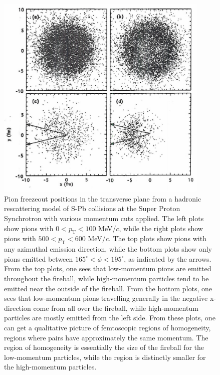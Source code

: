 \begin{figure}[hbtp]
\includegraphics[width=24pc]{Figures/BorrowedFigures/fighbt12.pdf}
\caption[Regions of homogeneity]{
Pion freezeout positions in the transverse plane from a hadronic rescattering model \cite{Humanic:2005ye} of S-Pb collisions at the Super Proton Synchrotron with various momentum cuts applied. 
The left plots show pions with $0 < p_\mathrm{T} < 100$ MeV/$c$, while the right plots show pions with $500 < p_\mathrm{T} < 600$ MeV/$c$.
The top plots show pions with any azimuthal emission direction, while the bottom plots show only pions emitted between $165^\circ < \phi < 195^\circ$, as indicated by the arrows.
From the top plots, one sees that low-momentum pions are emitted throughout the fireball, while high-momentum particles tend to be emitted near the outside of the fireball.
From the bottom plots, one sees that low-momentum pions travelling generally in the negative x-direction come from all over the fireball, while high-momentum particles are mostly emitted from the left side.
From these plots, one can get a qualitative picture of femtoscopic regions of homogeneity, regions where pairs have approximately the same momentum.
The region of homogeneity is essentially the size of the fireball for the low-momentum particles, while the region is distinctly smaller for the high-momentum particles.
}
\label{fig:RegionsOfHomogeneity}
\end{figure}

